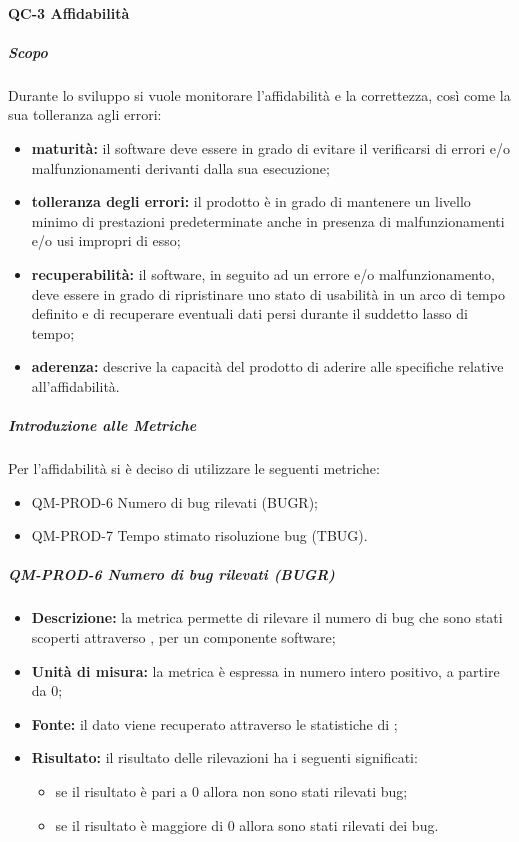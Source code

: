 		\paragraph{QC-3 Affidabilità}
			\subparagraph{Scopo}
				Durante lo sviluppo si vuole monitorare l'affidabilità e la correttezza, così come la sua tolleranza agli errori:
				\begin{itemize}
					\item \textbf{maturità:} il software deve essere in grado di evitare il verificarsi di errori e/o malfunzionamenti derivanti dalla sua esecuzione;
					\item \textbf{tolleranza degli errori:} il prodotto è in grado di mantenere un livello minimo di prestazioni predeterminate anche in presenza di malfunzionamenti e/o usi impropri di esso;
					\item \textbf{recuperabilità:} il software, in seguito ad un errore e/o malfunzionamento, deve essere in grado di ripristinare uno stato di usabilità in un arco di tempo definito e di recuperare eventuali dati persi durante il suddetto lasso di tempo;
					\item \textbf{aderenza:} descrive la capacità del prodotto di aderire alle specifiche relative all'affidabilità.
				\end{itemize}
			\subparagraph{Introduzione alle Metriche}
				Per l'affidabilità si è deciso di utilizzare le seguenti metriche:
				\begin{itemize}
					\item QM-PROD-6 Numero di bug rilevati (BUGR);
					\item QM-PROD-7 Tempo stimato risoluzione bug (TBUG).
				\end{itemize}
			\subparagraph{ QM-PROD-6 Numero di bug rilevati (BUGR)}
			\begin{itemize}
      			\item \textbf{Descrizione: }
					la metrica permette di rilevare il numero di bug che sono stati scoperti attraverso , per un componente software;
				\item \textbf{Unità di misura: }
					la metrica è espressa in numero intero positivo, a partire da 0;
				\item \textbf{Fonte: }
					il dato viene recuperato attraverso le statistiche di ;
				\item \textbf{Risultato: }
					il risultato delle rilevazioni ha i seguenti significati:
					\begin{itemize}
						\item se il risultato è pari a 0 allora non sono stati rilevati bug;
						\item se il risultato è maggiore di 0 allora sono stati rilevati dei bug.
					\end{itemize}
			\end{itemize}
